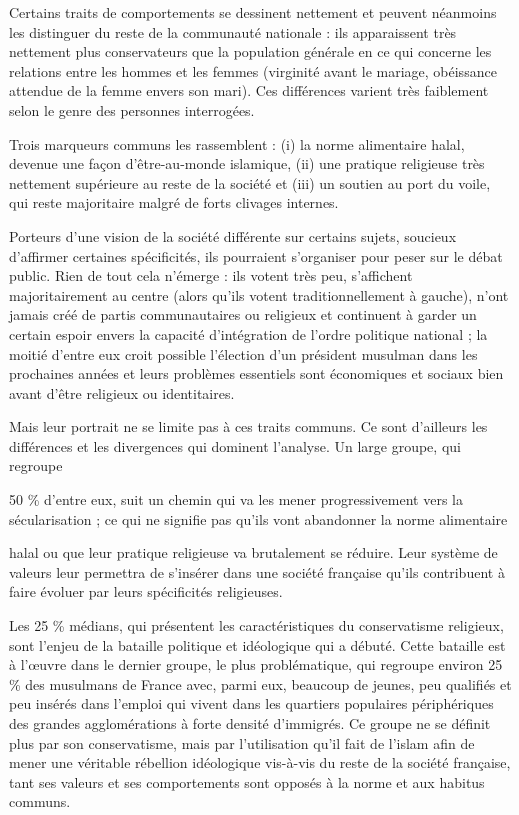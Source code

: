 Certains traits de comportements se dessinent nettement et peuvent
néanmoins les distinguer du reste de la communauté nationale : ils
apparaissent très nettement plus conservateurs que la population
générale en ce qui concerne les relations entre les hommes et les femmes
(virginité avant le mariage, obéissance attendue de la femme envers son
mari). Ces différences varient très faiblement selon le genre des
personnes interrogées.

Trois marqueurs communs les rassemblent : (i) la norme alimentaire
halal, devenue une façon d'être-au-monde islamique, (ii) une pratique
religieuse très nettement supérieure au reste de la société et (iii) un
soutien au port du voile, qui reste majoritaire malgré de forts clivages
internes.

Porteurs d'une vision de la société différente sur certains sujets,
soucieux d'affirmer certaines spécificités, ils pourraient s'organiser
pour peser sur le débat public. Rien de tout cela n'émerge : ils votent
très peu, s'affichent majoritairement au centre (alors qu'ils votent
traditionnellement à gauche), n'ont jamais créé de partis communautaires
ou religieux et continuent à garder un certain espoir envers la capacité
d'intégration de l'ordre politique national ; la moitié d'entre eux
croit possible l'élection d'un président musulman dans les prochaines
années et leurs problèmes essentiels sont économiques et sociaux bien
avant d'être religieux ou identitaires.

Mais leur portrait ne se limite pas à ces traits communs. Ce sont
d'ailleurs les différences et les divergences qui dominent l'analyse. Un
large groupe, qui regroupe

50 \% d'entre eux, suit un chemin qui va les mener progressivement vers
la sécularisation ; ce qui ne signifie pas qu'ils vont abandonner la
norme alimentaire



halal ou que leur pratique religieuse va brutalement se réduire. Leur
système de valeurs leur permettra de s'insérer dans une société
française qu'ils contribuent à faire évoluer par leurs spécificités
religieuses.

Les 25 \% médians, qui présentent les caractéristiques du conservatisme
religieux, sont l'enjeu de la bataille politique et idéologique qui a
débuté. Cette bataille est à l'œuvre dans le dernier groupe, le plus
problématique, qui regroupe environ 25 \% des musulmans de France avec,
parmi eux, beaucoup de jeunes, peu qualifiés et peu insérés dans
l'emploi qui vivent dans les quartiers populaires périphériques des
grandes agglomérations à forte densité d'immigrés. Ce groupe ne se
définit plus par son conservatisme, mais par l'utilisation qu'il fait de
l'islam afin de mener une véritable rébellion idéologique vis-à-vis du
reste de la société française, tant ses valeurs et ses comportements
sont opposés à la norme et aux habitus communs.


